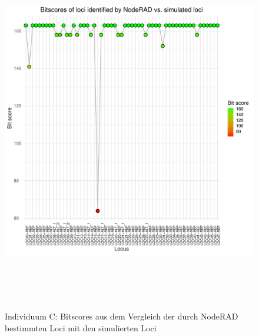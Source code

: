 \begin{figure}[H]
	\begin{center}
		\includegraphics[height=16cm]{bilder/evaluation/bitscores/C.plot_bitscores.pdf}
		\caption{Individuum C: Bitscores aus dem Vergleich der durch NodeRAD bestimmten Loci mit den simulierten Loci}
	\end{center}
\end{figure}
